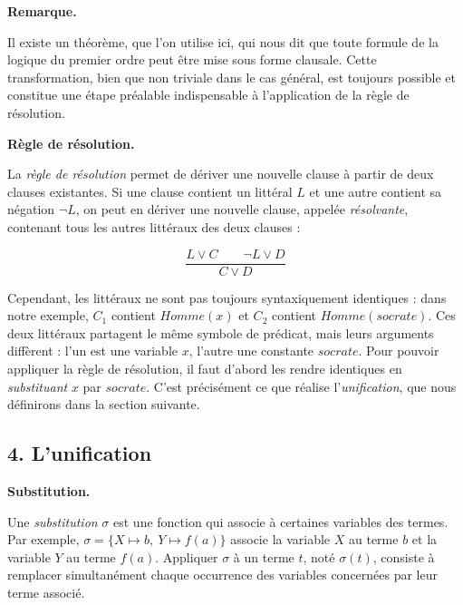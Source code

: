 \documentclass[11pt]{article}
\newenvironment{remarque}{%
    \begin{mdframed}[
        linecolor=sectioncolor!40,
        linewidth=0.8pt,
        backgroundcolor=sectioncolor!5,
        innerleftmargin=10pt,
        innerrightmargin=10pt,
        innertopmargin=6pt,
        innerbottommargin=6pt,
        skipabove=8pt,
        skipbelow=8pt
    ]
    \noindent\textbf{\small\color{sectioncolor}Remarque.}\enspace\small\itshape
}{%
    \end{mdframed}
}
\begin{document}
\begin{remarque}
    Il existe un théorème, que l'on utilise ici, qui nous dit que toute formule de la logique du premier ordre peut être mise sous forme clausale. Cette transformation, bien que non triviale dans le cas général, est toujours possible et constitue une étape préalable indispensable à l'application de la règle de résolution.
\end{remarque}

\vspace{0.4cm}
\noindent\textbf{Règle de résolution.}
\vspace{0.2cm}

La \textit{règle de résolution} permet de dériver une nouvelle clause à partir de deux clauses existantes. Si une clause contient un littéral $L$ et une autre contient sa négation $\neg L$, on peut en dériver une nouvelle clause, appelée \textit{résolvante}, contenant tous les autres littéraux des deux clauses :

\[
    \frac{L \vee C \qquad \neg L \vee D}{C \vee D}
\]

\vspace{0.2cm}
Cependant, les littéraux ne sont pas toujours syntaxiquement identiques : dans notre exemple, $C_1$ contient $\mathit{Homme}(x)$ et $C_2$ contient $\mathit{Homme}(\mathit{socrate})$. Ces deux littéraux partagent le même symbole de prédicat, mais leurs arguments diffèrent : l'un est une variable $x$, l'autre une constante $\mathit{socrate}$. Pour pouvoir appliquer la règle de résolution, il faut d'abord les rendre identiques en \textit{substituant} $x$ par $\mathit{socrate}$. C'est précisément ce que réalise l'\textit{unification}, que nous définirons dans la section suivante.

\subsection*{4. L'unification}
\label{unification}
\vspace{0.4cm}

\noindent\textbf{Substitution.}
\vspace{0.2cm}

Une \textit{substitution} $\sigma$ est une fonction qui associe à certaines variables des termes. Par exemple, $\sigma = \{X \mapsto b,\ Y \mapsto f(a)\}$ associe la variable $X$ au terme $b$ et la variable $Y$ au terme $f(a)$. Appliquer $\sigma$ à un terme $t$, noté $\sigma(t)$, consiste à remplacer simultanément chaque occurrence des variables concernées par leur terme associé.
\end{document}
